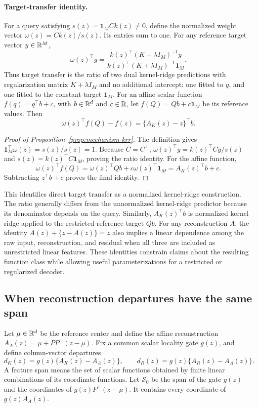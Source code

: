 \paragraph{Target-transfer identity.}
For a query satisfying $s(z)=\mathbf1_M^\top Ck(z)\ne0$, define the
normalized weight vector $\omega(z)=Ck(z)/s(z)$. Its entries sum to one.
For any reference target vector $y\in\mathbb{R}^M$,
\[
 \omega(z)^\top y=
 \frac{k(z)^\top(K+\lambda I_M)^{-1}y}
 {k(z)^\top(K+\lambda I_M)^{-1}\mathbf1_M}.
\]
Thus target transfer is the ratio of two dual kernel-ridge predictions
with regularization matrix $K+\lambda I_M$ and no additional intercept:
one fitted to $y$, and one fitted to the constant target $\mathbf1_M$.
For an affine scalar function $f(q)=q^\top b+c$, with
$b\in\mathbb{R}^d$ and $c\in\mathbb{R}$, let $f(Q)=Qb+c\mathbf1_M$ be its reference
values. Then
\[
 \omega(z)^\top f(Q)-f(z)=\{A_K(z)-z\}^\top b.
\]
\begin{proof}[Proof of Proposition~\ref{prop:mechanism-krr}]
The definition gives
$\mathbf1_M^\top\omega(z)=s(z)/s(z)=1$. Because $C=C^\top$,
$\omega(z)^\top y=k(z)^\top Cy/s(z)$ and
$s(z)=k(z)^\top C\mathbf1_M$, proving the ratio identity.
For the affine function,
\[
 \omega(z)^\top f(Q)
 =\omega(z)^\top Qb+c\omega(z)^\top\mathbf1_M
 =A_K(z)^\top b+c.
\]
Subtracting $z^\top b+c$ proves the final identity.
\end{proof}

This identifies direct target transfer as a normalized kernel-ridge
construction. The ratio generally differs from the unnormalized
kernel-ridge predictor because its denominator depends on the query.
Similarly, $A_K(z)^\top b$ is normalized kernel ridge applied to the
restricted reference target $Qb$. For any reconstruction $A$, the identity
$A(z)+\{z-A(z)\}=z$ also implies a linear dependence among the raw input,
reconstruction, and residual when all three are included as unrestricted
linear features. These identities constrain claims about the resulting
function class while allowing useful parameterizations for a restricted
or regularized decoder.

\subsection{When reconstruction departures have the same span}

Let $\mu\in\mathbb{R}^d$ be the reference center and define the affine
reconstruction $A_A(z)=\mu+PP^\top(z-\mu)$. Fix a common scalar locality
gate $g(z)$, and define column-vector departures
\[
 d_K(z)=g(z)\{A_K(z)-A_A(z)\},\qquad
 d_R(z)=g(z)\{A_R(z)-A_A(z)\}.
\]
A feature span means the set of scalar functions obtained by finite linear
combinations of its coordinate functions. Let $\mathcal S_0$ be the span
of the gate $g(z)$ and the coordinates of $g(z)P^\top(z-\mu)$.
It contains every coordinate of $g(z)A_A(z)$.

